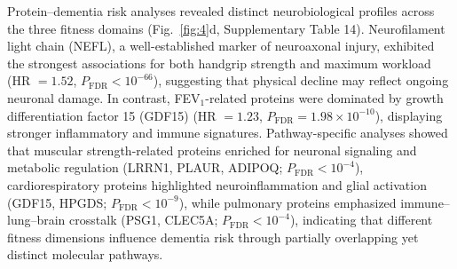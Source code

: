 \documentclass{article}
\begin{document}

Protein–dementia risk analyses revealed distinct neurobiological profiles across the three fitness domains (Fig.~\ref{fig:4}d, Supplementary Table 14). Neurofilament light chain (NEFL), a well-established marker of neuroaxonal injury, exhibited the strongest associations for both handgrip strength and maximum workload (HR $= 1.52$, $P_{\text{FDR}} < 10^{-66}$), suggesting that physical decline may reflect ongoing neuronal damage. In contrast, FEV$_1$-related proteins were dominated by growth differentiation factor 15 (GDF15) (HR $= 1.23$, $P_{\text{FDR}} = 1.98 \times 10^{-10}$), displaying stronger inflammatory and immune signatures. Pathway-specific analyses showed that muscular strength-related proteins enriched for neuronal signaling and metabolic regulation (LRRN1, PLAUR, ADIPOQ; $P_{\text{FDR}} < 10^{-4}$), cardiorespiratory proteins highlighted neuroinflammation and glial activation (GDF15, HPGDS; $P_{\text{FDR}} < 10^{-9}$), while pulmonary proteins emphasized immune–lung–brain crosstalk (PSG1, CLEC5A; $P_{\text{FDR}} < 10^{-4}$), indicating that different fitness dimensions influence dementia risk through partially overlapping yet distinct molecular pathways.
\end{document}
